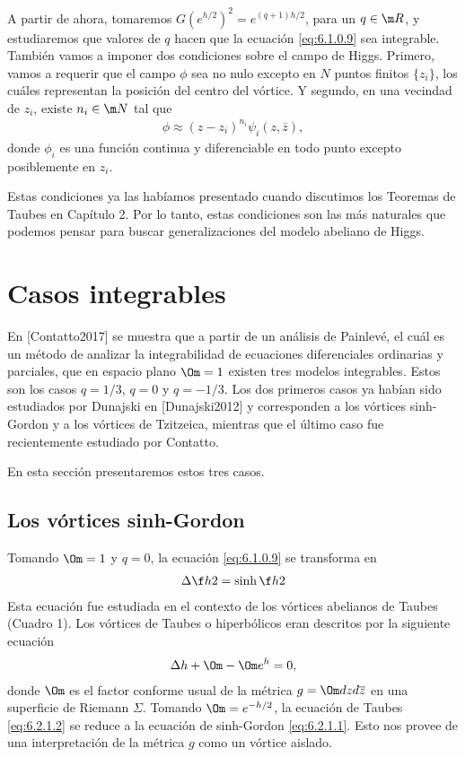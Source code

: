 A partir de ahora, tomaremos $G(e^{h/2})^2=e^{(q+1)h/2}$, para un $q\in\m R$, y estudiaremos que valores de $q$ hacen que la ecuación \eqref{eq:6.1.0.9} sea integrable. También vamos a imponer dos condiciones sobre el campo de Higgs. Primero, vamos a requerir que el campo $\phi$ sea no nulo excepto en $N$ puntos finitos $\{z_i\}$, los cuáles representan la posición del centro del vórtice. Y segundo, en una vecindad de $z_i$, existe $n_i\in\m N$ tal que
\begin{align}
	\phi\approx (z-z_i)^{n_i}\psi_i(z,\overline z), \label{eq:6.1.0.10}
\end{align}
donde $\phi_i$ es una función continua y diferenciable en todo punto excepto posiblemente en $z_i$.

Estas condiciones ya las habíamos presentado cuando discutimos los Teoremas de Taubes en Capítulo 2. Por lo tanto, estas condiciones son las más naturales que podemos pensar para buscar generalizaciones del modelo abeliano de Higgs.

\section{Casos integrables}

En [Contatto2017] se muestra que a partir de un análisis de Painlevé, el cuál es un método de analizar la integrabilidad de ecuaciones diferenciales ordinarias y parciales, que en espacio plano $\Om=1$ existen tres modelos integrables. Estos son los casos $q=1/3$, $q=0$ y $q=-1/3$. Los dos primeros casos ya habían sido estudiados por Dunajski en [Dunajski2012] y corresponden a los vórtices sinh-Gordon y a los vórtices de Tzitzeica, mientras que el último caso fue recientemente estudiado por Contatto.

En esta sección presentaremos estos tres casos.

\subsection{Los vórtices sinh-Gordon}

Tomando $\Om=1$ y $q=0$, la ecuación \eqref{eq:6.1.0.9} se transforma en
\begin{align}
	\Delta \f h2 = \sinh\f h2 \label{eq:6.2.1.1}
\end{align}
Esta ecuación fue estudiada en el contexto de los vórtices abelianos de Taubes (Cuadro 1). Los vórtices de Taubes o hiperbólicos eran descritos por la siguiente ecuación 
\begin{align}
	\Delta h+\Om-\Om e^h =0, \label{eq:6.2.1.2}
\end{align}
donde $\Om$ es el factor conforme usual de la métrica $g=\Om dzd\overline z$ en una superficie de Riemann $\Sigma$. Tomando $\Om=e^{-h/2}$, la ecuación de Taubes \eqref{eq:6.2.1.2} se reduce a la ecuación de sinh-Gordon \eqref{eq:6.2.1.1}. Esto nos provee de una interpretación de la métrica $g$ como un vórtice aislado.

